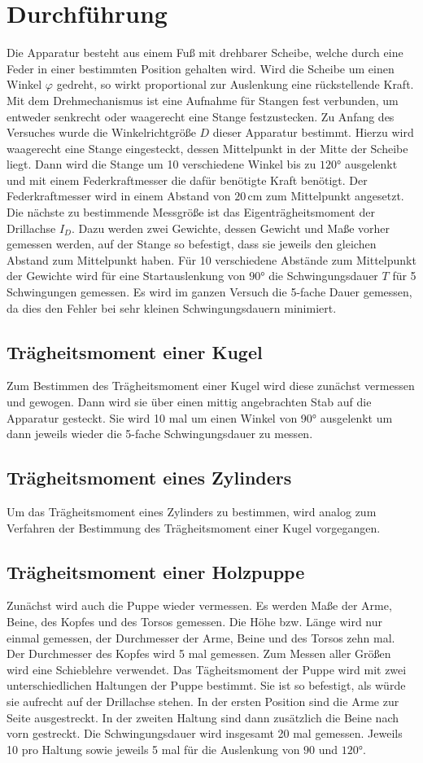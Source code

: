 \section{Durchführung}
\label{sec:Durchführung}
Die Apparatur besteht aus einem Fuß mit drehbarer Scheibe, welche durch eine Feder in einer bestimmten 
Position gehalten wird. Wird die Scheibe um einen Winkel $\varphi$ gedreht, so wirkt proportional zur Auslenkung 
eine rückstellende Kraft. Mit dem Drehmechanismus ist eine Aufnahme für Stangen fest verbunden, um entweder
senkrecht oder waagerecht eine Stange festzustecken.  
Zu Anfang des Versuches wurde die Winkelrichtgröße $D$ dieser Apparatur bestimmt. Hierzu wird waagerecht eine Stange 
eingesteckt, dessen Mittelpunkt in der Mitte der Scheibe liegt. Dann wird die Stange um 10 verschiedene Winkel bis zu 
$120°$ ausgelenkt und mit einem Federkraftmesser die dafür benötigte Kraft benötigt. Der Federkraftmesser wird 
in einem Abstand von $20$\,cm zum Mittelpunkt angesetzt. Die nächste zu bestimmende Messgröße ist das 
Eigenträgheitsmoment der Drillachse $I_D$. Dazu werden zwei Gewichte, dessen Gewicht und Maße vorher gemessen werden,
auf der Stange so befestigt, dass sie jeweils den gleichen Abstand zum Mittelpunkt haben.
Für 10 verschiedene Abstände zum Mittelpunkt der Gewichte wird für eine Startauslenkung 
von $90°$ die Schwingungsdauer $T$ für 5 Schwingungen gemessen. Es wird im ganzen Versuch die 5-fache Dauer gemessen, 
da dies den Fehler bei sehr kleinen Schwingungsdauern minimiert.
\subsection{Trägheitsmoment einer Kugel}
Zum Bestimmen des Trägheitsmoment einer Kugel wird diese zunächst vermessen und gewogen. Dann wird sie über einen mittig
angebrachten Stab auf die Apparatur gesteckt. Sie wird 10 mal um einen Winkel von 90° ausgelenkt um dann jeweils wieder 
die 5-fache Schwingungsdauer zu messen. 
\subsection{Trägheitsmoment eines Zylinders}
Um das Trägheitsmoment eines Zylinders zu bestimmen, wird analog zum Verfahren der Bestimmung des Trägheitsmoment einer Kugel vorgegangen.
\subsection{Trägheitsmoment einer Holzpuppe}
Zunächst wird auch die Puppe wieder vermessen. Es werden Maße der Arme, Beine, des Kopfes und des Torsos gemessen. Die 
Höhe bzw. Länge wird nur einmal gemessen, der Durchmesser der Arme, Beine und des Torsos zehn mal. Der Durchmesser des 
Kopfes wird 5 mal gemessen. Zum Messen aller Größen wird eine Schieblehre verwendet. Das Tägheitsmoment der Puppe wird 
mit zwei unterschiedlichen Haltungen der Puppe bestimmt. Sie ist so befestigt, als würde sie aufrecht auf der Drillachse 
stehen. In der ersten Position sind die Arme zur Seite ausgestreckt. In der zweiten Haltung sind dann zusätzlich die 
Beine nach vorn gestreckt. Die Schwingungsdauer wird insgesamt 20 mal gemessen. Jeweils 10 pro Haltung sowie jeweils 
5 mal für die Auslenkung von $90$ und $120°$.